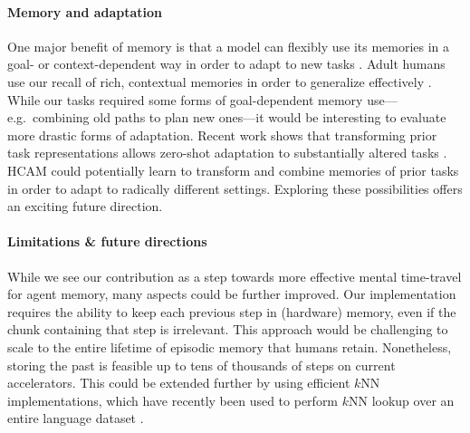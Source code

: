 \documentclass{article}
\begin{document}
\paragraph{Memory and adaptation} One major benefit of memory is that a model can flexibly use its memories in a goal- or context-dependent way in order to adapt to new tasks \citep{tulving1985memory,suddendorf2009mental,kumaran2016learning}. Adult humans use our recall of rich, contextual memories in order to generalize effectively \citep{suddendorf2009mental,NGO2021}. While our tasks required some forms of goal-dependent memory use---e.g.\ combining old paths to plan new ones---it would be interesting to evaluate more drastic forms of adaptation. Recent work shows that transforming prior task representations allows zero-shot adaptation to substantially altered tasks \citep{lampinen2020transforming}. HCAM could potentially learn to transform and combine memories of prior tasks in order to adapt to radically different settings. Exploring these possibilities offers an exciting future direction.\vspace{-0.5em}

\paragraph{Limitations \& future directions} \label{sec:discussion:limitations}

While we see our contribution as a step towards more effective mental time-travel for agent memory, many aspects could be further improved. Our implementation requires the ability to keep each previous step in (hardware) memory, even if the chunk containing that step is irrelevant. This approach would be challenging to scale to the entire lifetime of episodic memory that humans retain. Nonetheless, storing the past is feasible up to tens of thousands of steps on current accelerators. This could be extended further by using efficient \(k\)NN implementations, which have recently been used to perform \(k\)NN lookup over an entire language dataset \citep{khandelwal2019generalization}.
\end{document}
